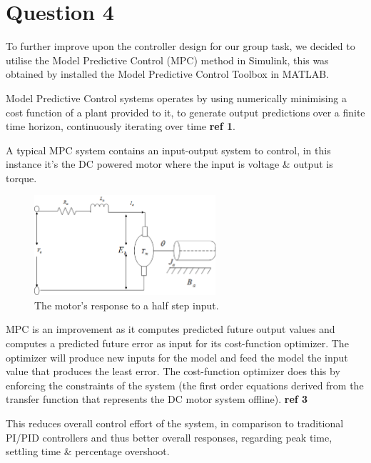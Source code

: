 \documentclass[11pt, onecolumn]{article}
\begin{document}
\section*{Question 4}
\par To further improve upon the controller design for our group task, we decided to utilise the Model Predictive Control (MPC) method in Simulink, this was obtained by installed the Model Predictive Control Toolbox in MATLAB.
\par Model Predictive Control systems operates by using numerically minimising a cost function of a plant provided to it, to generate output predictions over a finite time horizon, continuously iterating over time \textbf{ref 1}.
\par A typical MPC system contains an input-output system to control, in this instance it’s the DC powered motor where the input is voltage \& output is torque.
\begin{figure}[h!]
    \centering
    \includegraphics[width=0.6\textwidth]{q4-schematic.png}
    \caption{The motor's response to a half step input.}
    \label{fig:q3-second}
\end{figure}
\par MPC is an improvement as it computes predicted future output values and computes a predicted future error as input for its cost-function optimizer. The optimizer will produce new inputs for the model and feed the model the input value that produces the least error. The cost-function optimizer does this by enforcing the constraints of the system (the first order equations derived from the transfer function that represents the DC motor system offline). \textbf{ref 3}
\par This reduces overall control effort of the system, in comparison to traditional PI/PID controllers and thus better overall responses, regarding peak time, settling time \& percentage overshoot.



\end{document}
